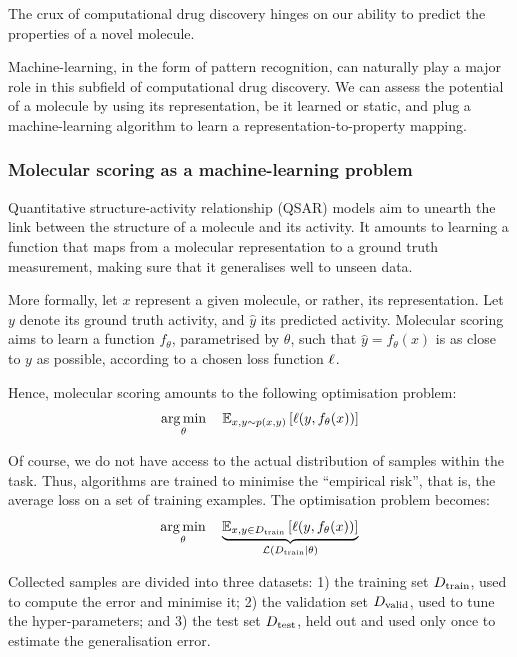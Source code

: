 \documentclass[11pt]{article}
\numberwithin{equation}{subsection}
\begin{document}
The crux of computational drug discovery hinges on our ability to predict the properties of a novel molecule.

Machine-learning, in the form of pattern recognition, can naturally play a major role in this subfield of computational drug discovery. We can assess the potential of a molecule by using its representation, be it learned or static, and plug a machine-learning algorithm to learn a representation-to-property mapping.


\subsubsection{Molecular scoring as a machine-learning problem}

Quantitative structure-activity relationship (QSAR) models aim to unearth the link between the structure of a molecule and its activity. It amounts to learning a function that maps from a molecular representation to a ground truth measurement, making sure that it generalises well to unseen data.

More formally, let $x$ represent a given molecule, or rather, its representation. Let $y$ denote its ground truth activity, and $\hat{y}$ its predicted activity. Molecular scoring aims to learn a function $f_\theta$, parametrised by $\theta$, such that $\hat{y} = f_\theta(x)$ is as close to $y$ as possible, according to a chosen loss function $\ell$.

Hence, molecular scoring amounts to the following optimisation problem:
\begin{equation}
  \operatorname*{arg\,min}_\theta \quad \mathbb{E}_{x, y \sim p(x, y)} \left[ \ell (y, f_\theta(x)) \right]
\end{equation}

Of course, we do not have access to the actual distribution of samples within the task. Thus, algorithms are trained to minimise the ``empirical risk'', that is, the average loss on a set of training examples. The optimisation problem becomes:
\begin{equation}
  \label{eq:scoring}
  \operatorname*{arg\,min}_\theta \quad \underbrace{\mathbb{E}_{x, y \in {D_{\mathrm{train}}}} \left[ \ell (y, f_\theta(x)) \right]}_{\mathcal{L}({D_{\mathrm{train}}} \mid \theta)}
\end{equation}

Collected samples are divided into three datasets: 1) the training set ${D_{\mathrm{train}}}$, used to compute the error and minimise it; 2) the validation set ${D_{\mathrm{valid}}}$, used to tune the hyper-parameters; and 3) the test set ${D_{\mathrm{test}}}$, held out and used only once to estimate the generalisation error.
\end{document}
